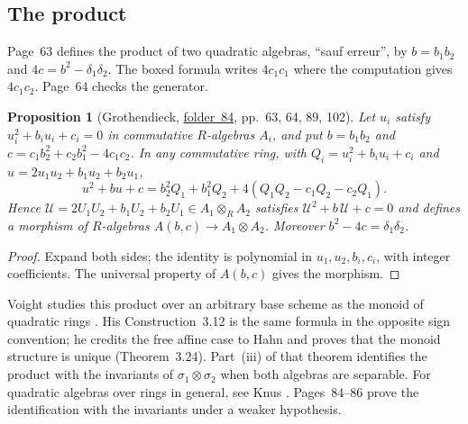 \documentclass[11pt,a4paper]{amsart}
\newtheorem{proposition}[theorem]{Proposition}
\theoremstyle{definition}
\theoremstyle{remark}
\newcommand{\fac}[1]{\href{https://grothendieck.umontpellier.fr/#1.pdf}{folder~#1}}
\begin{document}
\subsection*{The product}
Page~63 defines the product of two quadratic algebras, ``sauf erreur'', by $b = b_1b_2$ and $4c = b^2 - \delta_1\delta_2$. The boxed formula writes $4c_1c_1$ where the computation gives $4c_1c_2$. Page~64 checks the generator.

\begin{proposition}[Grothendieck, \fac{84}, pp.~63, 64, 89, 102]\label{prop:product}
Let $u_i$ satisfy $u_i^2 + b_iu_i + c_i = 0$ in commutative $R$-algebras $A_i$, and put $b = b_1b_2$ and $c = c_1b_2^2 + c_2b_1^2 - 4c_1c_2$. In any commutative ring, with $Q_i = u_i^2 + b_iu_i + c_i$ and $u = 2u_1u_2 + b_1u_2 + b_2u_1$,
\[
u^2 + bu + c = b_2^2Q_1 + b_1^2Q_2 + 4(Q_1Q_2 - c_1Q_2 - c_2Q_1).
\]
Hence $\mathcal U = 2U_1U_2 + b_1U_2 + b_2U_1 \in A_1 \otimes_R A_2$ satisfies $\mathcal U^2 + b\,\mathcal U + c = 0$ and defines a morphism of $R$-algebras $A(b, c) \to A_1 \otimes A_2$. Moreover $b^2 - 4c = \delta_1\delta_2$.
\end{proposition}

\begin{proof}
Expand both sides; the identity is polynomial in $u_1, u_2, b_i, c_i$, with integer coefficients. The universal property of $A(b, c)$ gives the morphism.
\end{proof}

Voight studies this product over an arbitrary base scheme as the monoid of quadratic rings \cite{voight2016}. His Construction~3.12 is the same formula in the opposite sign convention; he credits the free affine case to Hahn and proves that the monoid structure is unique (Theorem~3.24). Part~(iii) of that theorem identifies the product with the invariants of $\sigma_1 \otimes \sigma_2$ when both algebras are separable. For quadratic algebras over rings in general, see Knus \cite{knus1991}. Pages~84--86 prove the identification with the invariants under a weaker hypothesis.
\end{document}
